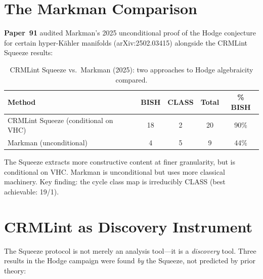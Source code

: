 \documentclass[11pt,twoside,openany]{report}
\theoremstyle{remark}
\newcommand{\BISH}{\textsf{BISH}}
\newcommand{\CLASS}{\textsf{CLASS}}
\newcommand{\paperref}[1]{\textbf{Paper~#1}}
\begin{document}
\section{The Markman Comparison}

\paperref{91} audited Markman's 2025 unconditional proof of the Hodge conjecture for certain hyper-K\"ahler manifolds (arXiv:2502.03415) alongside the CRMLint Squeeze results:

\begin{table}[htbp]
\centering\small
\caption{CRMLint Squeeze vs.\ Markman (2025): two approaches to Hodge algebraicity compared.}
\label{tab:markman}
\renewcommand{\arraystretch}{1.2}
\begin{tabular}{@{}l c c c c@{}}
\toprule
\textbf{Method} & \textbf{\BISH} & \textbf{\CLASS} & \textbf{Total} & \textbf{\% \BISH} \\
\midrule
\rowcolor{green!6}
CRMLint Squeeze (conditional on VHC) & 18 & 2 & 20 & 90\% \\
\rowcolor{red!4}
Markman (unconditional) & 4 & 5 & 9 & 44\% \\
\bottomrule
\end{tabular}
\end{table}

The Squeeze extracts more constructive content at finer granularity, but is conditional on VHC. Markman is unconditional but uses more classical machinery. Key finding: the cycle class map is irreducibly \CLASS{} (best achievable: 19/1).


\section{CRMLint as Discovery Instrument}

The Squeeze protocol is not merely an analysis tool---it is a \emph{discovery} tool. Three results in the Hodge campaign were found \emph{by} the Squeeze, not predicted by prior theory:
\end{document}
